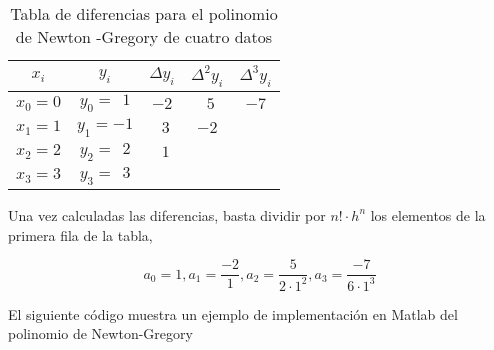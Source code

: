 \begin{table}[h]
\centering
\caption{Tabla de diferencias para el polinomio de Newton -Gregory de cuatro datos}
\begin{tabular}{ccccc}
$x_i$&$y_i$&$\Delta y_i$&$\Delta^2 y_i$&$\Delta^3 y_i$\\
\hline
$x_0=0$&$y_0=\ \  1$&$-2$&$\ \ 5$&$-7$\\
$x_1=1$&$y_1=-1$&$ \ \ 3$&$ -2$\\
$x_2=2$&$y_2=\ \ 2$&$\ \ 1$\\
$x_3=3$&$y_3=\ \ 3$\\

\end{tabular}
\label{tabnewton}
\end{table}
\begin{paracol}{2}
Una vez calculadas las diferencias, basta dividir por $n!\cdot h^n$ los elementos de la primera fila de la tabla,
\end{paracol}
\begin{equation*}
a_0=1, a_1=\frac{-2}{1}, a_2=\frac{5}{2\cdot 1^2}, a_3=\frac{-7}{6\cdot 1^3}
\end{equation*}
\begin{paracol}{2}
El siguiente código muestra un ejemplo de implementación en Matlab del polinomio de Newton-Gregory
\end{paracol}



    
